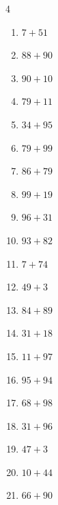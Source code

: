 \begin{multicols}{4}
\begin{enumerate}
  \item $7+51$
        \phantom{$=58$}

  \item $88+90$
        \phantom{$=178$}

\columnbreak %

\resetques

  \item $90+10$
        \phantom{$=100$}

  \item $79+11$
        \phantom{$=90$}

  \item $34+95$
        \phantom{$=129$}

  \item $79+99$
        \phantom{$=178$}

  \item $86+79$
        \phantom{$=165$}

  \item $99+19$
        \phantom{$=118$}

  \item $96+31$
        \phantom{$=127$}

  \item $93+82$
        \phantom{$=175$}

  \item $7+74$
        \phantom{$=81$}

  \item $49+3$
        \phantom{$=52$}

  \item $84+89$
        \phantom{$=173$}

  \item $31+18$
        \phantom{$=49$}

  \item $11+97$
        \phantom{$=108$}

  \item $95+94$
        \phantom{$=189$}

  \item $68+98$
        \phantom{$=166$}

  \item $31+96$
        \phantom{$=127$}

  \item $47+3$
        \phantom{$=50$}

  \item $10+44$
        \phantom{$=54$}

  \item $66+90$
        \phantom{$=156$}


\end{enumerate}
\end{multicols}
